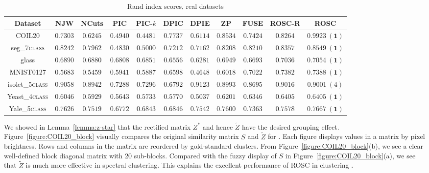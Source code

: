 \begin{table}[!htbp]
\centering
\resizebox{0.85\linewidth}{!}
{
\begin{tabular}{|c||c|c||c|c|c|c||c|c||c|c|} \hline
Dataset &NJW & NCuts  & PIC & PIC-$k$ & DPIC & DPIE & ZP & FUSE & ROSC-R & ROSC \\ \hline 
COIL20 &$0.7303$ & $0.6245$  & $0.4940$ & $0.4481$ & $0.7737$ & $0.6114$ & $0.8534$ & $0.7424$ & $0.8264$ & $\bm{0.9923\ (1)}$ \\ \hline
seg\_7\textsc{class} &$0.8242$ & $0.7962$  & $0.4830$ & $0.5000$ & $0.7212$ & $0.7162$ & $0.8208$ & $0.8210$ & $0.8357$ & $\bm{0.8549\ (1)}$ \\ \hline
glass &$0.6890$ & $0.6880$  & $0.6808$ & $0.6851$ & $0.6556$ & $0.6281$ & $0.6949$ & $0.6693$ & $0.7036$ & $\bm{0.7054\ (1)}$ \\ \hline
MNIST0127 & $0.5683$ & $0.5459$  & $0.5941$ & $0.5887$ & $0.6598$ & $0.4648$ & $0.6018$ & $0.7022$ & $0.7382$ & $\bm{0.7388\ (1)}$ \\ \hline
isolet\_5\textsc{class}&$0.9058$ & $0.8942$  & $0.7288$ & $0.7296$ & $0.6792$ & $\bm{0.9123}$ & $0.8993$ & $0.8695$ & $0.9016$ & $0.9001\ (4)$ \\ \hline
Yeast\_4\textsc{class}&$0.6046$ & $0.5929$  & $0.5643$ & $0.5733$ & $0.5770$ & $0.5037$ & $0.6201$ & $0.6346$ & $\bm{0.6405}$ & $\bm{0.6405\ (1)}$ \\ \hline
Yale\_5\textsc{class} &$0.7626$ & $0.7519$  & $0.6772$ & $0.6843$ & $0.6846$ & $0.7542$ & $0.7600$ & $0.7363$ & $0.7578$ & $\bm{0.7667\ (1)}$ \\ \hline
\end{tabular}
}
\caption{Rand index scores, real datasets}
\label{table:ri_real}
\end{table}

We showed in Lemma~\ref{lemma:z-star} that the rectified matrix $Z^*$ and hence $\tilde{Z}$ have the desired grouping effect.
Figure~\ref{figure:COIL20_block} visually compares the original similarity matrix $S$ and
$\tilde{Z}$ for \coil.
Each figure displays values in a matrix by pixel brightness.
Rows and columns in the matrix are reordered by gold-standard clusters.
From Figure~\ref{figure:COIL20_block}(b), 
we see a clear well-defined block diagonal matrix with 20 sub-blocks. 
Compared with the fuzzy display of $S$ in Figure~\ref{figure:COIL20_block}(a),
we see that $\tilde{Z}$ is much more effective in spectral clustering. 
This explains the excellent performance of ROSC in clustering \coil.


